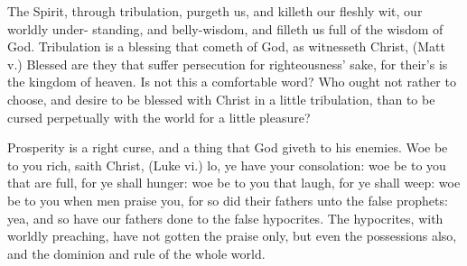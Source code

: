 \documentclass{custom}
\begin{document}
The Spirit, through tribulation, purgeth us, 
and killeth our fleshly wit, our worldly under- 
standing, and belly-wisdom, and filleth us full of 
the wisdom of God. Tribulation is a blessing 
that cometh of God, as witnesseth Christ, (Matt v.) 
Blessed are they that suffer persecution for 
righteousness' sake, for their's is the kingdom of 
heaven. Is not this a comfortable word? Who 
ought not rather to choose, and desire to be blessed 
with Christ in a little tribulation, than to be cursed 
perpetually with the world for a little pleasure? 

Prosperity is a right curse, and a thing that 
God giveth to his enemies. Woe be to you 
rich, saith Christ, (Luke vi.) lo, ye have your 
consolation: woe be to you that are full, for ye 
shall hunger: woe be to you that laugh, for ye 
shall weep: woe be to you when men praise you, 
for so did their fathers unto the false prophets: yea, 
and so have our fathers done to the false hypocrites. 
The hypocrites, with worldly preaching, have not 
gotten the praise only, but even the possessions 
also, and the dominion and rule of the whole world. 
\end{document}
